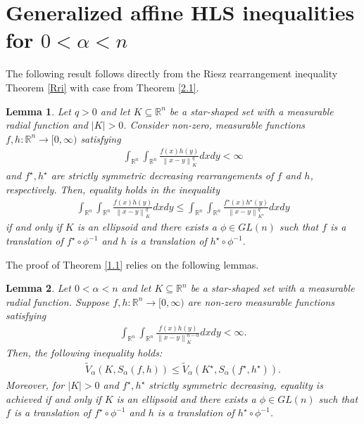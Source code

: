\documentclass[preprint,12pt]{elsarticle}
\newtheorem{lem}{Lemma}
\begin{document}
\section{Generalized affine HLS inequalities for $0<\alpha<n$}
The following result follows directly from the Riesz rearrangement inequality Theorem \ref{Rri} with case from Theorem \ref{2.1}.
\begin{lem}\label{4.1} Let $q > 0$ and let $K \subseteq \mathbb{R}^n$ be a star-shaped set with a measurable radial function and $|K| > 0$. Consider non-zero, measurable functions $f, h: \mathbb{R}^n \to [0, \infty)$ satisfying
	\begin{eqnarray*}
		\int_{\mathbb{R}^n}\int_{\mathbb{R}^n}\frac{f(x)h(y)}{{\left \| x-y\right \|}_{K }^{q}}dxdy<\infty 
	\end{eqnarray*}
	and $f^{\star}, h^{\star}$ are strictly symmetric decreasing rearrangements of $f$ and $h$, respectively. Then, equality holds in the inequality
	\begin{eqnarray*}
		\int_{\mathbb{R}^n}\int_{\mathbb{R}^n}\frac{f(x)h(y)}{{\left \| x-y\right \|}_{K }^{q}}dxdy \leq  \int_{\mathbb{R}^n}\int_{\mathbb{R}^n}\frac{f^{\star }(x)h^{\star }(y)}{{\left \| x-y\right \|}_{K ^{\star }}^{q}}dxdy
	\end{eqnarray*}
	if and only if $K$ is an ellipsoid and there exists a $\phi\in GL(n)$ such that $f$ is a translation of $f^{\star} \circ \phi^{-1}$ and $h$ is a translation of $h^{\star} \circ \phi^{-1}$. 
\end{lem}
The proof of Theorem \ref{1.1} relies on the following lemmas.
\begin{lem}\label{4.2}  Let $0 < \alpha < n$ and let $K \subseteq \mathbb{R}^n$ be a star-shaped set with a measurable radial function. Suppose $f, h: \mathbb{R}^n \to [0, \infty)$ are non-zero measurable functions satisfying
	\begin{eqnarray*}
		\int_{\mathbb{R}^n }\int_{\mathbb{R}^n} \frac{f(x)h(y)}{{\left \| x-y \right \|}_{K}^{n-\alpha}} dxdy < \infty.
		\end{eqnarray*}
		Then, the following inequality holds:
		\begin{eqnarray*}
			\widetilde{V}_{\alpha} (K, {S}_{\alpha}(f, h)) \leq \widetilde{V}_{\alpha} (K^{\star}, {S}_{\alpha}(f^{\star}, h^{\star})).
		\end{eqnarray*}
		Moreover, for $|K| > 0$ and $f^{\star },h^{\star }$ strictly symmetric decreasing, equality is achieved if and only if $K$ is an ellipsoid and there exists a $\phi\in GL(n)$ such that $f$ is a translation of $f^{\star} \circ \phi^{-1}$ and $h$ is a translation of $h^{\star} \circ \phi^{-1}$. 
\end{lem}
\end{document}
